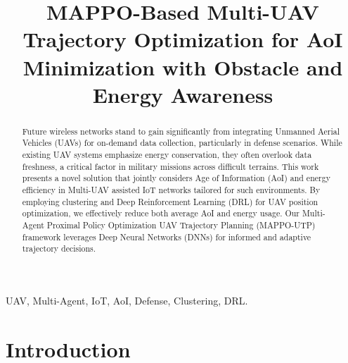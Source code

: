 \documentclass[conference]{IEEEtran}
\begin{document}
\title{MAPPO-Based Multi-UAV Trajectory Optimization for AoI Minimization with Obstacle and Energy Awareness\\
}

\author{
}
\maketitle

\begin{abstract}
Future wireless networks stand to gain significantly from integrating Unmanned Aerial Vehicles (UAVs) for on-demand data collection, particularly in defense scenarios. While existing UAV systems emphasize energy conservation, they often overlook data freshness, a critical factor in military missions across difficult terrains. This work presents a novel solution that jointly considers Age of Information (AoI) and energy efficiency in Multi-UAV assisted IoT networks tailored for such environments. By employing clustering and Deep Reinforcement Learning (DRL) for UAV position optimization, we effectively reduce both average AoI and energy usage. Our Multi-Agent Proximal Policy Optimization UAV Trajectory Planning (MAPPO-UTP) framework leverages Deep Neural Networks (DNNs) for informed and adaptive trajectory decisions.


\end{abstract}

\begin{IEEEkeywords}
UAV, Multi-Agent, IoT, AoI, Defense, Clustering, DRL.
\end{IEEEkeywords}

\section{Introduction}
\end{document}
